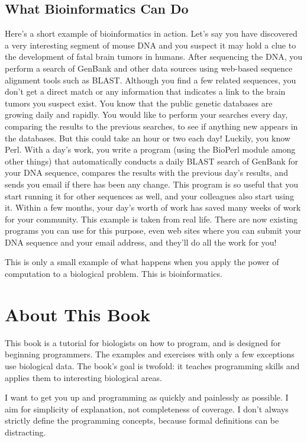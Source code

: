\subsection*{What Bioinformatics Can Do}
Here's a short example of bioinformatics in action. Let's say you have discovered a very interesting segment of mouse DNA and you suspect it may hold a clue to the development of fatal brain tumors in humans. After sequencing the DNA, you perform a search of GenBank and other data sources using web-based sequence alignment tools such as BLAST. Although you find a few related sequences, you don't get a direct match or any information that indicates a link to the brain tumors you suspect exist. You know that the public genetic databases are growing daily and rapidly. You would like to perform your searches every day, comparing the results to the previous searches, to see if anything new appears in the databases. But this could take an hour or two each day! Luckily, you know Perl. With a day's work, you write a program (using the BioPerl module among other things) that automatically conducts a daily BLAST search of GenBank for your DNA sequence, compares the results with the previous day's results, and sends you email if there has been any change. This program is so useful that you start running it for other sequences as well, and your colleagues also start using it. Within a few months, your day's worth of work has saved many weeks of work for your community. This example is taken from real life. There are now existing programs you can use for this purpose, even web sites where you can submit your DNA sequence and your email address, and they'll do all the work for you!

This is only a small example of what happens when you apply the power of computation to a biological problem. This is bioinformatics.

\section*{About This Book}
This book is a tutorial for biologists on how to program, and is designed for beginning programmers. The examples and exercises with only a few exceptions use biological data. The book's goal is twofold: it teaches programming skills and applies them to interesting biological areas.

I want to get you up and programming as quickly and painlessly as possible. I aim for simplicity of explanation, not completeness of coverage. I don't always strictly define the programming concepts, because formal definitions can be distracting.

